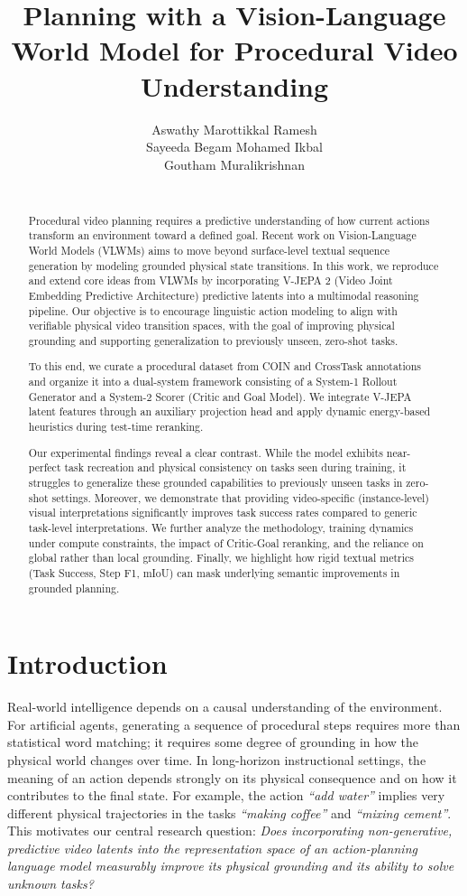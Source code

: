 \documentclass{article}
\title{Planning with a Vision-Language World Model for Procedural Video Understanding}
\author{%
  Aswathy Marottikkal Ramesh \\
  \And
  Sayeeda Begam Mohamed Ikbal \\
  \And
  Goutham Muralikrishnan \\
  \AND
  \normalfont{Multimodal Foundation Models} \\
}
\begin{document}
\maketitle

\begin{abstract}
Procedural video planning requires a predictive understanding of how current actions transform an environment toward a defined goal. Recent work on Vision-Language World Models (VLWMs) aims to move beyond surface-level textual sequence generation by modeling grounded physical state transitions. In this work, we reproduce and extend core ideas from VLWMs by incorporating V-JEPA 2 (Video Joint Embedding Predictive Architecture) predictive latents into a multimodal reasoning pipeline. Our objective is to encourage linguistic action modeling to align with verifiable physical video transition spaces, with the goal of improving physical grounding and supporting generalization to previously unseen, zero-shot tasks.

To this end, we curate a procedural dataset from COIN and CrossTask annotations and organize it into a dual-system framework consisting of a System-1 Rollout Generator and a System-2 Scorer (Critic and Goal Model). We integrate V-JEPA latent features through an auxiliary projection head and apply dynamic energy-based heuristics during test-time reranking.

Our experimental findings reveal a clear contrast. While the model exhibits near-perfect task recreation and physical consistency on tasks seen during training, it struggles to generalize these grounded capabilities to previously unseen tasks in zero-shot settings. Moreover, we demonstrate that providing video-specific (instance-level) visual interpretations significantly improves task success rates compared to generic task-level interpretations. We further analyze the methodology, training dynamics under compute constraints, the impact of Critic-Goal reranking, and the reliance on global rather than local grounding. Finally, we highlight how rigid textual metrics (Task Success, Step F1, mIoU) can mask underlying semantic improvements in grounded planning.
\end{abstract}

\section{Introduction}
Real-world intelligence depends on a causal understanding of the environment. For artificial agents, generating a sequence of procedural steps requires more than statistical word matching; it requires some degree of grounding in how the physical world changes over time. In long-horizon instructional settings, the meaning of an action depends strongly on its physical consequence and on how it contributes to the final state. For example, the action \textit{``add water''} implies very different physical trajectories in the tasks \textit{``making coffee''} and \textit{``mixing cement''}. This motivates our central research question: \emph{Does incorporating non-generative, predictive video latents into the representation space of an action-planning language model measurably improve its physical grounding and its ability to solve unknown tasks?}
\end{document}
